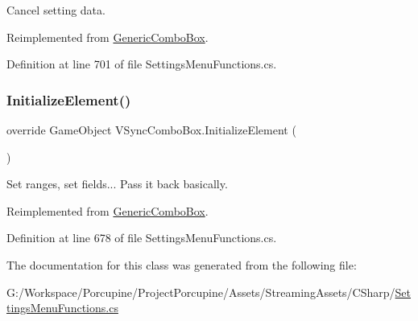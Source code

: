 Cancel setting data. 



Reimplemented from \hyperlink{class_generic_combo_box_a0949a84cf1e33d13346cb90597e005ce}{Generic\+Combo\+Box}.



Definition at line 701 of file Settings\+Menu\+Functions.\+cs.

\mbox{\label{class_v_sync_combo_box_a6de5084b8e4b47a434de53bab6650d82}} 
\subsubsection{\texorpdfstring{Initialize\+Element()}{InitializeElement()}}
{\footnotesize\ttfamily override Game\+Object V\+Sync\+Combo\+Box.\+Initialize\+Element (\begin{DoxyParamCaption}{ }\end{DoxyParamCaption})\hspace{0.3cm}{\ttfamily [virtual]}}



Set ranges, set fields... Pass it back basically. 



Reimplemented from \hyperlink{class_generic_combo_box_ae1800a7c68d3af046a2b147e117437ff}{Generic\+Combo\+Box}.



Definition at line 678 of file Settings\+Menu\+Functions.\+cs.



The documentation for this class was generated from the following file\+:\begin{DoxyCompactItemize}
\item 
G\+:/\+Workspace/\+Porcupine/\+Project\+Porcupine/\+Assets/\+Streaming\+Assets/\+C\+Sharp/\hyperlink{_settings_menu_functions_8cs}{Settings\+Menu\+Functions.\+cs}\end{DoxyCompactItemize}

